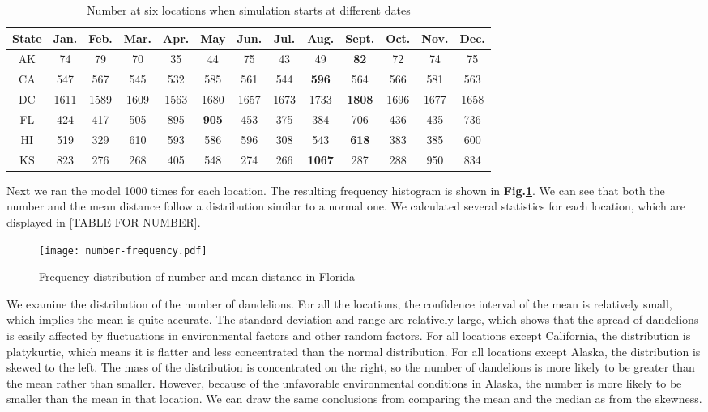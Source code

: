 \documentclass[12pt]{article}
\begin{document}
			{
				\fontsize{10}{14}\selectfont
				{
					\begin{longtable}{ccccccccccccc}
						\caption{Number at six locations when simulation starts at different dates}
						\label{tb:start}\\
						\toprule
						State&Jan.&Feb.&Mar.&Apr.&May&Jun.&Jul.&Aug.&Sept.&Oct.&Nov.&Dec.\\
						\toprule
						AK&74&79&70&35&44&75&43&49&\color{blue}\textbf{82}&72&74&75\\
						CA&547&567&545&532&585&561&544&\color{blue}\textbf{596}&564&566&581&563\\
						DC&1611&1589&1609&1563&1680&1657&1673&1733&\color{blue}\textbf{1808}&1696&1677&1658\\
						FL&424&417&505&895&\color{blue}\textbf{905}&453&375&384&706&436&435&736\\
						HI&519&329&610&593&586&596&308&543&\color{blue}\textbf{618}&383&385&600\\
						KS&823&276&268&405&548&274&266&\color{blue}\textbf{1067}&287&288&950&834\\
						\bottomrule
					\end{longtable}
				}
			}
			
			Next we ran the model 1000 times for each location.  The resulting frequency histogram is shown in \textbf{Fig.\ref{fig:freqDand}}.  We can see that both the number and the mean distance follow a distribution similar to a normal one.  We calculated several statistics for each location, which are displayed in [TABLE FOR NUMBER].
			
			\begin{figure}[htbp]
				\centering
				\texttt{[image: number-frequency.pdf]}
				\caption{Frequency distribution of number and mean distance in Florida}
				\label{fig:freqDand}
			\end{figure}
			
			We examine the distribution of the number of dandelions.  For all the locations, the confidence interval of the mean is relatively small, which implies the mean is quite accurate.  The standard deviation and range are relatively large, which shows that the spread of dandelions is easily affected by fluctuations in environmental factors and other random factors.  For all locations except California, the distribution is platykurtic, which means it is flatter and less concentrated than the normal distribution.  For all locations except Alaska, the distribution is skewed to the left.  The mass of the distribution is concentrated on the right, so the number of dandelions is more likely to be greater than the mean rather than smaller.  However, because of the unfavorable environmental conditions in Alaska, the number is more likely to be smaller than the mean in that location.  We can draw the same conclusions from comparing the mean and the median as from the skewness.
			
\end{document}
